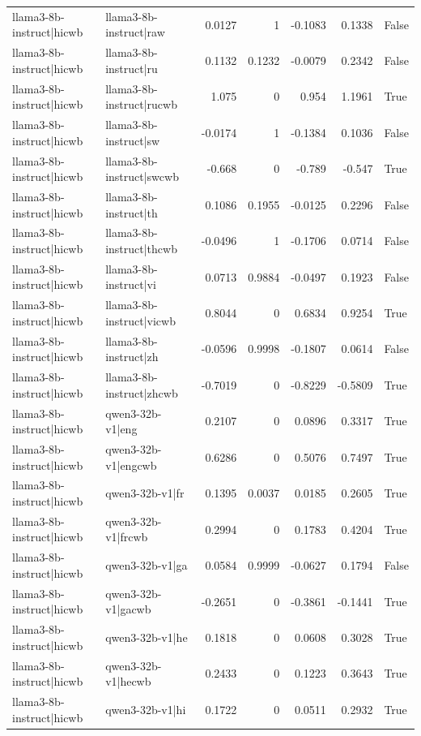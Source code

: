 \begin{table}
\begin{tabular}{l l r r r r l}
llama3-8b-instruct|hicwb & llama3-8b-instruct|raw & 0.0127 & 1 & -0.1083 & 0.1338 & False \\
llama3-8b-instruct|hicwb & llama3-8b-instruct|ru & 0.1132 & 0.1232 & -0.0079 & 0.2342 & False \\
llama3-8b-instruct|hicwb & llama3-8b-instruct|rucwb & 1.075 & 0 & 0.954 & 1.1961 & True \\
llama3-8b-instruct|hicwb & llama3-8b-instruct|sw & -0.0174 & 1 & -0.1384 & 0.1036 & False \\
llama3-8b-instruct|hicwb & llama3-8b-instruct|swcwb & -0.668 & 0 & -0.789 & -0.547 & True \\
llama3-8b-instruct|hicwb & llama3-8b-instruct|th & 0.1086 & 0.1955 & -0.0125 & 0.2296 & False \\
llama3-8b-instruct|hicwb & llama3-8b-instruct|thcwb & -0.0496 & 1 & -0.1706 & 0.0714 & False \\
llama3-8b-instruct|hicwb & llama3-8b-instruct|vi & 0.0713 & 0.9884 & -0.0497 & 0.1923 & False \\
llama3-8b-instruct|hicwb & llama3-8b-instruct|vicwb & 0.8044 & 0 & 0.6834 & 0.9254 & True \\
llama3-8b-instruct|hicwb & llama3-8b-instruct|zh & -0.0596 & 0.9998 & -0.1807 & 0.0614 & False \\
llama3-8b-instruct|hicwb & llama3-8b-instruct|zhcwb & -0.7019 & 0 & -0.8229 & -0.5809 & True \\
llama3-8b-instruct|hicwb & qwen3-32b-v1|eng & 0.2107 & 0 & 0.0896 & 0.3317 & True \\
llama3-8b-instruct|hicwb & qwen3-32b-v1|engcwb & 0.6286 & 0 & 0.5076 & 0.7497 & True \\
llama3-8b-instruct|hicwb & qwen3-32b-v1|fr & 0.1395 & 0.0037 & 0.0185 & 0.2605 & True \\
llama3-8b-instruct|hicwb & qwen3-32b-v1|frcwb & 0.2994 & 0 & 0.1783 & 0.4204 & True \\
llama3-8b-instruct|hicwb & qwen3-32b-v1|ga & 0.0584 & 0.9999 & -0.0627 & 0.1794 & False \\
llama3-8b-instruct|hicwb & qwen3-32b-v1|gacwb & -0.2651 & 0 & -0.3861 & -0.1441 & True \\
llama3-8b-instruct|hicwb & qwen3-32b-v1|he & 0.1818 & 0 & 0.0608 & 0.3028 & True \\
llama3-8b-instruct|hicwb & qwen3-32b-v1|hecwb & 0.2433 & 0 & 0.1223 & 0.3643 & True \\
llama3-8b-instruct|hicwb & qwen3-32b-v1|hi & 0.1722 & 0 & 0.0511 & 0.2932 & True \\

\end{tabular}
\end{table}
